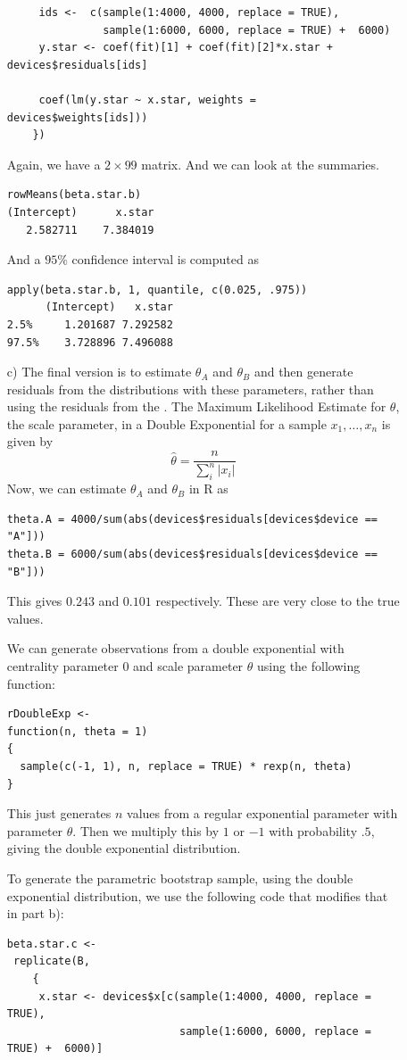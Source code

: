 \documentclass{article}
\begin{document}
\begin{description}
\begin{enumerate}
\begin{verbatim}
     ids <-  c(sample(1:4000, 4000, replace = TRUE),
               sample(1:6000, 6000, replace = TRUE) +  6000)
     y.star <- coef(fit)[1] + coef(fit)[2]*x.star + devices$residuals[ids]

     coef(lm(y.star ~ x.star, weights = devices$weights[ids]))
    })
\end{verbatim}

Again, we have a $2 \times 99$ matrix.
And we can look at the summaries.
\begin{verbatim}
rowMeans(beta.star.b)
(Intercept)      x.star 
   2.582711    7.384019 
\end{verbatim}
And a $95\%$ confidence interval is computed as
\begin{verbatim}
apply(beta.star.b, 1, quantile, c(0.025, .975))
      (Intercept)   x.star
2.5%     1.201687 7.292582
97.5%    3.728896 7.496088
\end{verbatim}


\item[c)] The final version is to estimate $\theta_A$ and $\theta_B$
  and then generate residuals from the distributions with these
  parameters, rather than using the residuals from the
  .  The Maximum Likelihood Estimate for $\theta$, the
  scale parameter, in a Double Exponential for a sample
  $x_1, \ldots, x_n$ is given by
  $$\hat\theta = \frac{n}{\sum_i^n | x_i |}$$
  Now, we can estimate $\theta_A$ and $\theta_B$ in R as
\begin{verbatim}
theta.A = 4000/sum(abs(devices$residuals[devices$device == "A"]))
theta.B = 6000/sum(abs(devices$residuals[devices$device == "B"]))
\end{verbatim}
This gives $0.243$ and $0.101$ respectively.  These are very close to
the true values.

We can generate observations from a double exponential with centrality
parameter 0 and scale parameter $\theta$ using the following function:
\begin{verbatim}
rDoubleExp <-
function(n, theta = 1)
{
  sample(c(-1, 1), n, replace = TRUE) * rexp(n, theta)
}  
\end{verbatim}
This just generates $n$ values from a regular exponential parameter
with parameter $\theta$. Then we multiply this by $1$ or $-1$ with 
probability $.5$, giving the double exponential distribution.


To generate the parametric bootstrap sample, using the double
exponential distribution, we use the following code
that modifies that in part b):
\begin{verbatim}
beta.star.c <-
 replicate(B,
    {
     x.star <- devices$x[c(sample(1:4000, 4000, replace = TRUE),
                           sample(1:6000, 6000, replace = TRUE) +  6000)]


\end{verbatim}
\end{enumerate}
\end{description}
\end{document}
